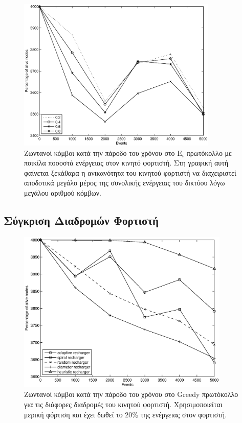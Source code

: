 \begin{figure}[H]
  \centering
   \includegraphics[width=0.85\textwidth]{experiments/4000nodes/3.smallVSbigpercentage/alive_nodes_ei_rc_per_our.eps}
  \caption{Ζωντανοί κόμβοι κατά την πάροδο του χρόνου στο $\text{E}_{i}$ πρωτόκολλο με ποικίλα ποσοστά ενέργειας στον κινητό φορτιστή. Στη γραφική αυτή φαίνεται
ξεκάθαρα η ανικανότητα του κινητού φορτιστή να διαχειριστεί αποδοτικά μεγάλο μέρος της συνολικής ενέργειας του δικτύου λόγω μεγάλου αριθμού κόμβων.}
  \label{fig:5_3exp_1_3}
\end{figure}

\subsection{Σύγκριση Διαδρομών Φορτιστή}\label{subc:result5_4}
\begin{figure}[H]
  \centering
  \includegraphics[width=0.9\textwidth]{experiments/4000nodes/4.ourVSnaive/alive_nodes_greedy_rc_per_our-spiral-random-diameter-heuristic.eps}
  \caption{Ζωντανοί κόμβοι κατά την πάροδο του χρόνου στο Greedy πρωτόκολλο για τις διάφορες διαδρομές του κινητού φορτιστή. Χρησιμοποιείται μερική φόρτιση και έχει
δωθεί το 20\% της ενέργειας στον φορτιστή.}
  \label{fig:5_4exp_1_1}
\end{figure}

